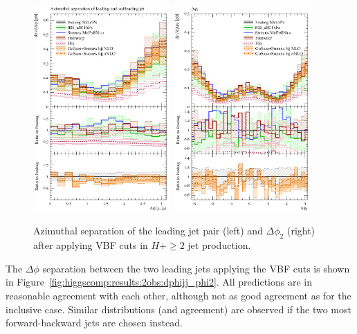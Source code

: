 \begin{figure}[t!]
  \centering
  \includegraphics[width=0.47\textwidth]{figures/hjetscomp_deltaphi_jj_VBF.pdf}
  \hfill
  \includegraphics[width=0.47\textwidth]{figures/hjetscomp_deltaphi2_VBF.pdf}
  \caption{
    Azimuthal separation of the leading jet pair (left) and 
    $\Delta\phi_2$ (right) after applying VBF cuts in $H+\ge2$ jet
    production.
    \label{fig:higgscomp:results:VBFobs:dphijj_phi2}
  }
\end{figure}

The $\Delta\phi$ separation between the two leading jets applying the
VBF cuts is shown in
Figure~\ref{fig:higgscomp:results:2obs:dphijj_phi2}. All predictions
are in reasonable agreement with each other, although not as good
agreement as for the inclusive case. Similar distributions (and
agreement) are observed if the two most forward-backward jets are
chosen instead.

